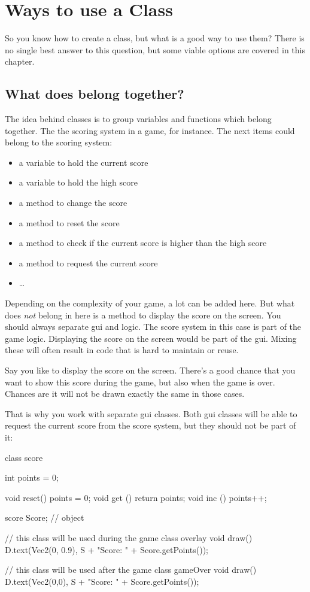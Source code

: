 \chapter{Ways to use a Class}

So you know how to create a class, but what is a good way to use them? There is no single best answer to this question, but some viable options are covered in this chapter.

\section{What does belong together?}
The idea behind classes is to group variables and functions which belong together. The the scoring system in a game, for instance. The next items could belong to the scoring system:

\begin{itemize}
\item a variable to hold the current score
\item a variable to hold the high score
\item a method to change the score
\item a method to reset the score
\item a method to check if the current score is higher than the high score
\item a method to request the current score
\item \ldots
\end{itemize}

Depending on the complexity of your game, a lot can be added here. But what does \textsl{not} belong in here is a method to display the score on the screen. You should always separate gui and logic. The score system in this case is part of the game logic. Displaying the score on the screen would be part of the gui. Mixing these will often result in code that is hard to maintain or reuse.

Say you like to display the score on the screen. There's a good chance that you want to show this score during the game, but also when the game is over. Chances are it will not be drawn exactly the same in those cases.

That is why you work with separate gui classes. Both gui classes will be able to request the current score from the score system, but they should not be part of it:


\begin{code}
class score {
  int points = 0;
  
  void reset() { points = 0;    }
  void get  () { return points; }
  void inc  () { points++;      }
}
score Score; // object

// this class will be used during the game
class overlay {
  void draw() {
    D.text(Vec2(0, 0.9), S + "Score: " + Score.getPoints());
  }
}

// this class will be used after the game
class gameOver {
  void draw() {
    D.text(Vec2(0,0), S + "Score: " + Score.getPoints());
  } 
}
\end{code}

